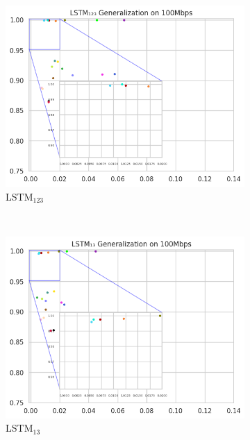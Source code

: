 \documentclass[a4paper,fleqn]{cas-sc}
\begin{document}
\begin{figure}[h!]
\begin{minipage}[t]{0.46\textwidth}
			\begin{subfigure}[t]{0.33\textwidth}
				\includegraphics[draft=false, width=\textwidth]{./figs/Generalizacao-LSTM123-100Mbps.png} 
				\caption{LSTM$_{123}$}
				\label{fig:Generalizacao-LSTM123-100Mbps}
			\end{subfigure}%
			~
			\begin{subfigure}[t]{0.33\textwidth}
				\includegraphics[draft=false, width=\textwidth]{./figs/Generalizacao-LSTM13-100Mbps.png} 
				\caption{LSTM$_{13}$}
				\label{fig:2a}
			\end{subfigure}%
			~
			\begin{subfigure}[t]{0.33\textwidth}

\end{subfigure}
\end{minipage}
\end{figure}
\end{document}
